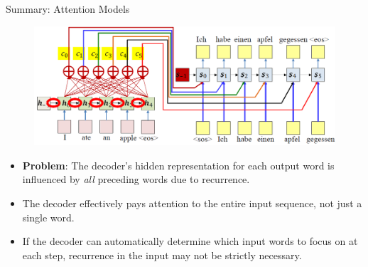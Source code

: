 \begin{frame}{Summary: Attention Models}
    \begin{figure}
        \centering
        \includegraphics[width=\linewidth, height=0.6\textheight,keepaspectratio]{images/nlp/attention-models-2.png}
    \end{figure}
    \begin{itemize}
        \setlength{\itemsep}{-0.25em}
        \item \textbf{Problem}: The decoder's hidden representation for each output word is influenced by \textit{all} preceding words due to recurrence.
        \item The decoder effectively pays attention to the entire input sequence, not just a single word.
        \item If the decoder can automatically determine which input words to focus on at each step, recurrence in the input may not be strictly necessary.
    \end{itemize}
\end{frame}